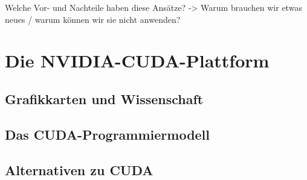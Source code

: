 Welche Vor- und Nachteile haben diese Ansätze? -> Warum brauchen wir etwas neues / warum können wir sie nicht anwenden?

\section{Die NVIDIA{\textregistered}-CUDA{\textregistered}-Plattform}

\subsection{Grafikkarten und Wissenschaft}

\subsection{Das CUDA{\textregistered}-Programmiermodell}

\subsection{Alternativen zu CUDA{\textregistered}}
